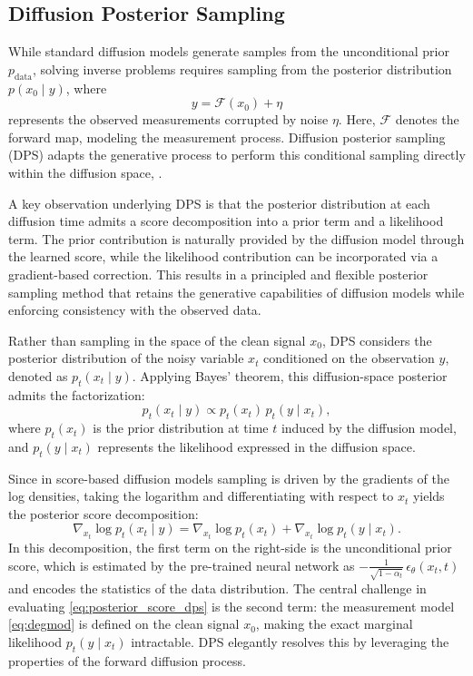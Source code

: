 \documentclass[a4paper,11pt]{article}
\renewcommand{\varepsilon}{\epsilon}
\theoremstyle{definition}
\theoremstyle{plain}
\theoremstyle{remark}
\begin{document}
\subsection{Diffusion Posterior Sampling}
\label{sec:dps}

While standard diffusion models generate samples from the unconditional prior $p_{\mathrm{data}}$, solving inverse problems requires sampling from the posterior distribution $p(x_0 \mid y)$, where 
\begin{equation}
y = \mathcal{F}(x_0) + \eta
\label{eq:degmod}
\end{equation}
represents the observed measurements corrupted by noise $\eta$. Here, $\mathcal{F}$ denotes the forward map, modeling the measurement process. Diffusion posterior sampling (DPS) adapts the generative process to perform this conditional sampling directly within the diffusion space, \cite{DPS24}.

A key observation underlying DPS is that the posterior distribution at each diffusion
time admits a score decomposition into a prior term and a likelihood term.
The prior contribution is naturally provided by the diffusion model through the
learned score, while the likelihood contribution can be incorporated via a
gradient-based correction.
This results in a principled and flexible posterior sampling method that retains the
generative capabilities of diffusion models while enforcing consistency with the
observed data.

Rather than sampling in the space of the clean signal $x_0$, DPS considers the posterior distribution of the noisy variable $x_t$ conditioned on the observation $y$, denoted as $p_t(x_t \mid y)$. Applying Bayes' theorem, this diffusion-space posterior admits the factorization:
\begin{equation}\label{eq:bayes-pt}
p_t(x_t \mid y) \propto p_t(x_t)\,p_t(y \mid x_t),
\end{equation}
where $p_t(x_t)$ is the prior distribution at time $t$ induced by the diffusion model, and $p_t(y \mid x_t)$ represents the likelihood expressed in the diffusion space.

Since in score-based diffusion models sampling is driven by the gradients of the log densities, taking the logarithm and differentiating with respect to $x_t$ yields the posterior score decomposition:
\begin{equation}
\label{eq:posterior_score_dps}
\nabla_{x_t} \log p_t(x_t \mid y)
=
\nabla_{x_t} \log p_t(x_t)
+
\nabla_{x_t} \log p_t(y \mid x_t).
\end{equation}
In this decomposition, the first term on the right-side is the unconditional prior score, which is estimated by the pre-trained neural network as $-\frac{1}{\sqrt{1-\bar\alpha_t}}\,\varepsilon_\theta(x_t,t)$ and encodes the statistics of the data distribution. 
The central challenge in evaluating \eqref{eq:posterior_score_dps} is the second term: the measurement model \eqref{eq:degmod} is defined on the clean signal $x_0$, making the exact marginal likelihood $p_t(y \mid x_t)$ intractable. DPS elegantly resolves this by leveraging the properties of the forward diffusion process. 
\end{document}
